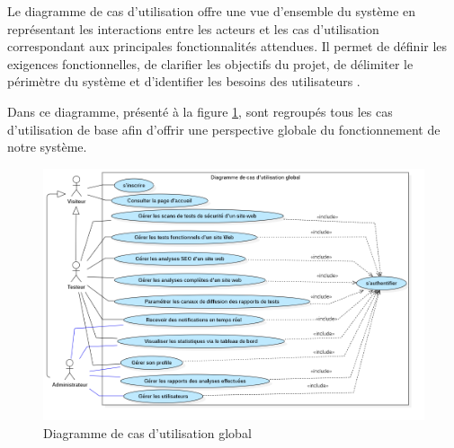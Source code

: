 Le diagramme de cas d'utilisation offre une vue d'ensemble du système en représentant les interactions entre les acteurs et les cas d'utilisation correspondant aux principales fonctionnalités attendues. Il permet de définir les exigences fonctionnelles, de clarifier les objectifs du projet, de délimiter le périmètre du système et d’identifier les besoins des utilisateurs \cite{case}.

Dans ce diagramme, présenté à la figure \ref{fig:UseCaseDiagram1}, sont regroupés tous les cas d’utilisation de base afin d’offrir une perspective globale du fonctionnement de notre système.
\begin{figure}[H]
\centering
\includegraphics[width=\textwidth]{chapitres/ch2/img/global-last- use-case.png}
\caption{Diagramme de cas d'utilisation global}
\label{fig:UseCaseDiagram1}
\end{figure}
\vspace{-0.3cm}